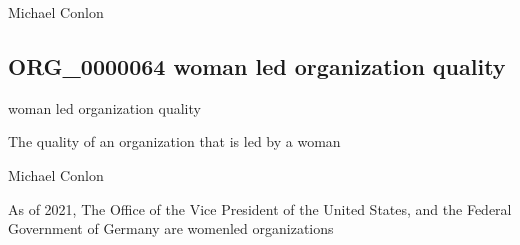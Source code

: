 \documentclass[letterpaper,10pt,english]{sphinxmanual}
\begin{document}
\begin{sphinxShadowBox}

\sphinxAtStartPar
{}
\end{sphinxShadowBox}

\begin{sphinxShadowBox}

\sphinxAtStartPar
Michael Conlon 
\end{sphinxShadowBox}
\begin{quote}

\ignorespaces \end{quote}


\subsection{ORG\_0000064 \sphinxhyphen{} woman led organization quality}
\label{\detokenize{doc-ORG_0000064:org-0000064-woman-led-organization-quality}}\label{\detokenize{doc-ORG_0000064:index-0}}\label{\detokenize{doc-ORG_0000064::doc}}
\begin{sphinxShadowBox}

\sphinxAtStartPar
woman led organization quality
\end{sphinxShadowBox}

\begin{sphinxShadowBox}

\sphinxAtStartPar
The quality of an organization that is led by a woman
\end{sphinxShadowBox}

\begin{sphinxShadowBox}

\sphinxAtStartPar
Michael Conlon 
\end{sphinxShadowBox}

\begin{sphinxShadowBox}

\sphinxAtStartPar
As of 2021, The Office of the Vice President of the United States, and the Federal Government of Germany are women\sphinxhyphen{}led organizations
\end{sphinxShadowBox}
\end{document}

